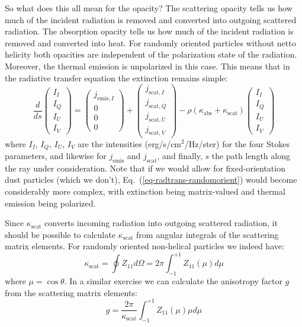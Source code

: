 \documentclass{report}
\begin{document}
So what does this all mean for the opacity? The scattering opacity tells us
how much of the incident radiation is removed and converted into outgoing
scattered radiation. The absorption opacity tells us how much of the
incident radiation is removed and converted into heat. For randomly oriented
particles without netto helicity both opacities are independent of the
polarization state of the radiation. Moreover, the thermal emission
is unpolarized in this case. This means that in the radiative
transfer equation the extinction remains simple:
\begin{equation}\label{eq-radtrans-randomorient}
\frac{d}{ds}\left(
\begin{matrix}
I_I\\I_Q\\I_U\\I_V
\end{matrix}
\right)
=
\left(
\begin{matrix}
j_{\mathrm{emis},I}\\0\\0\\0
\end{matrix}
\right)
+
\left(
\begin{matrix}
j_{\mathrm{scat},I}\\j_{\mathrm{scat},Q}\\j_{\mathrm{scat},U}\\j_{\mathrm{scat},V}
\end{matrix}
\right)
-\rho(\kappa_{\mathrm{abs}}+\kappa_{\mathrm{scat}})
\left(
\begin{matrix}
I_I\\I_Q\\I_U\\I_V
\end{matrix}
\right)
\end{equation}
where $I_I$, $I_Q$, $I_U$, $I_V$ are the intensities (erg/s/cm$^2$/Hz/ster)
for the four Stokes parameters, and likewise for $j_{\mathrm{emis}}$ and
$j_{\mathrm{scat}}$, and finally, $s$ the path length along the ray under
consideration. Note that if we would allow for fixed-orientation dust
particles (which we don't), Eq.~(\ref{eq-radtrans-randomorient}) would
become considerably more complex, with extinction being matrix-valued and
thermal emission being polarized.

Since $\kappa_{\mathrm{scat}}$ converts incoming radiation into outgoing
scattered radiation, it should be possible to calculate 
$\kappa_{\mathrm{scat}}$ from angular integrals of the scattering
matrix elements. For randomly oriented non-helical particles we indeed
have:
\begin{equation}\label{eq-scatmat-selfconsist-kappa}
\kappa_{\mathrm{scat}} = \oint Z_{11} d\Omega = 
2\pi \int_{-1}^{+1}Z_{11}(\mu)d\mu
\end{equation}
where $\mu=\cos\theta$. In a similar exercise we can calculate the
anisotropy factor $g$ from the scattering matrix elements:
\begin{equation}\label{eq-scatmat-selfconsist-g}
g = \frac{2\pi}{\kappa_{\mathrm{scat}}}\int_{-1}^{+1}Z_{11}(\mu)\mu d\mu
\end{equation}
\end{document}
